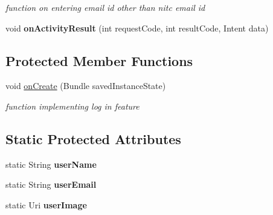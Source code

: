 \begin{DoxyCompactItemize}
\begin{DoxyCompactList}\small\item\em function on entering email id other than nitc email id \end{DoxyCompactList}\item 
\hypertarget{classcom_1_1example_1_1sel_1_1lostfound_1_1MainActivity_ad934ef9a9347dc67bcaf5365213f58da}{void {\bfseries on\-Activity\-Result} (int request\-Code, int result\-Code, Intent data)}\label{classcom_1_1example_1_1sel_1_1lostfound_1_1MainActivity_ad934ef9a9347dc67bcaf5365213f58da}

\end{DoxyCompactItemize}
\subsection*{Protected Member Functions}
\begin{DoxyCompactItemize}
\item 
\hypertarget{classcom_1_1example_1_1sel_1_1lostfound_1_1MainActivity_ac0ce1d56e609a8b69d6227c6d4d59f48}{void \hyperlink{classcom_1_1example_1_1sel_1_1lostfound_1_1MainActivity_ac0ce1d56e609a8b69d6227c6d4d59f48}{on\-Create} (Bundle saved\-Instance\-State)}\label{classcom_1_1example_1_1sel_1_1lostfound_1_1MainActivity_ac0ce1d56e609a8b69d6227c6d4d59f48}

\begin{DoxyCompactList}\small\item\em function implementing log in feature \end{DoxyCompactList}\end{DoxyCompactItemize}
\subsection*{Static Protected Attributes}
\begin{DoxyCompactItemize}
\item 
\hypertarget{classcom_1_1example_1_1sel_1_1lostfound_1_1MainActivity_a1a8d41b931cf85891f5fd3497d34a32a}{static String {\bfseries user\-Name}}\label{classcom_1_1example_1_1sel_1_1lostfound_1_1MainActivity_a1a8d41b931cf85891f5fd3497d34a32a}

\item 
\hypertarget{classcom_1_1example_1_1sel_1_1lostfound_1_1MainActivity_a02198420522a5b05dbc3202b74dd9a59}{static String {\bfseries user\-Email}}\label{classcom_1_1example_1_1sel_1_1lostfound_1_1MainActivity_a02198420522a5b05dbc3202b74dd9a59}

\item 
\hypertarget{classcom_1_1example_1_1sel_1_1lostfound_1_1MainActivity_a92248fd7e13b4972f457ad9791ba253c}{static Uri {\bfseries user\-Image}}\label{classcom_1_1example_1_1sel_1_1lostfound_1_1MainActivity_a92248fd7e13b4972f457ad9791ba253c}

\end{DoxyCompactItemize}


